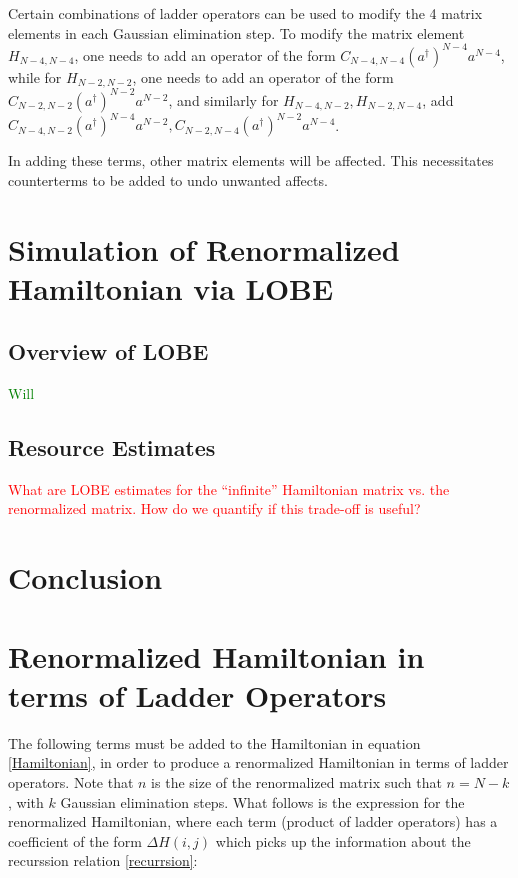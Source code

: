 \documentclass[%
 reprint,
nofootinbib,
 amsmath,amssymb,
 aps,
]{revtex4-2}
\numberwithin{equation}{section}
\begin{document}
Certain combinations of ladder operators can be used to modify the 4 matrix elements in each Gaussian elimination step. To modify the matrix element $H_{N-4, N-4}$, one needs to add an operator of the form $C_{N-4, N-4}(a^\dagger)^{N-4}a^{N-4}$, while for $H_{N-2, N-2}$, one needs to add an operator of the form $C_{N-2, N-2}(a^\dagger)^{N-2}a^{N-2}$, and similarly for $H_{N-4, N-2}, H_{N-2, N-4}$, add $C_{N-4, N-2}(a^\dagger)^{N-4}a^{N-2}, C_{N-2, N-4}(a^\dagger)^{N-2}a^{N-4}$.

In adding these terms, other matrix elements will be affected. This necessitates counterterms to be added to undo unwanted affects. 

\section{Simulation of Renormalized Hamiltonian via LOBE}
\subsection{Overview of LOBE}
\textcolor{Green}{Will}

\subsection{Resource Estimates}
\textcolor{red}{What are LOBE estimates for the ``infinite'' Hamiltonian matrix vs. the 
renormalized matrix. How do we quantify if this trade-off is useful?}

\section{Conclusion}



\appendix
\section{Renormalized Hamiltonian in terms of Ladder Operators}
The following terms must be added to the Hamiltonian in equation \ref{Hamiltonian}, in order to produce a renormalized Hamiltonian in terms of ladder operators. Note that $n$ is the size of the renormalized matrix such that $n = N - k$, with $k$ Gaussian elimination steps.
What follows is the expression for the renormalized Hamiltonian, where each term (product of ladder operators) has a coefficient of the form $\Delta H(i,j)$ which picks up the information about the recurssion relation \ref{recurrsion}:
\end{document}
